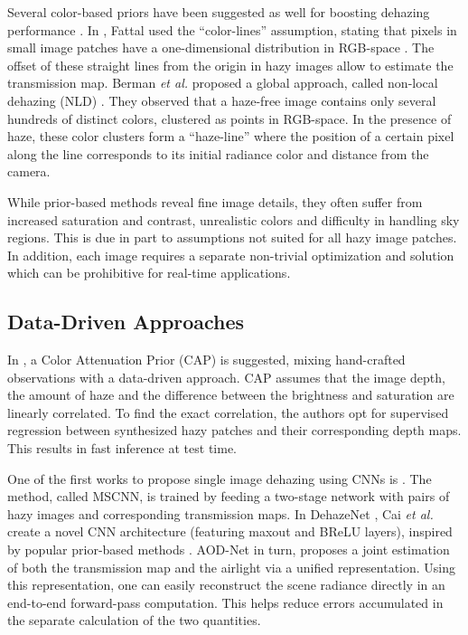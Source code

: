 \documentclass[10pt,twocolumn,twoside]{IEEEtran}
\begin{document}
Several color-based priors have been suggested as well for boosting dehazing performance \cite{color_lines,color_ellipsoid,NLD}. In \cite{color_lines}, Fattal used the ``color-lines'' assumption, stating that pixels in small image patches have a one-dimensional distribution in RGB-space \cite{color_lines_assumption}. The offset of these straight lines from the origin in hazy images allow to estimate the transmission map. Berman \textit{et al.} proposed a global approach, called non-local dehazing (NLD) \cite{NLD}. They observed that a haze-free image contains only several hundreds of distinct colors, clustered as points in RGB-space. In the presence of haze, these color clusters form a ``haze-line'' where the position of a certain pixel along the line corresponds to its initial radiance color and distance from the camera.

While prior-based methods reveal fine image details, they often suffer from increased saturation and contrast, unrealistic colors and difficulty in handling sky regions. This is due in part to assumptions not suited for all hazy image patches. In addition, each image requires a separate non-trivial optimization and solution which can be prohibitive for real-time applications.

\subsection{Data-Driven Approaches}

In \cite{CAP}, a Color Attenuation Prior (CAP) is suggested, mixing hand-crafted observations with a data-driven approach. CAP assumes that the image depth, the amount of haze and the difference between the brightness and saturation are linearly correlated. To find the exact correlation, the authors opt for supervised regression between synthesized hazy patches and their corresponding depth maps. This results in fast inference at test time.

One of the first works to propose single image dehazing using CNNs is \cite{mscnn}. The method, called MSCNN, is trained by feeding a two-stage network with pairs of hazy images and corresponding transmission maps. In DehazeNet \cite{dehazenet}, Cai \textit{et al.} create a novel CNN architecture
(featuring maxout and BReLU layers), inspired by popular prior-based methods \cite{DCP,contrast_tan,CAP,hue_dehazing}. AOD-Net \cite{aodnet} in turn, proposes a joint estimation of both the transmission map and the airlight via a unified representation. Using this representation, one can easily reconstruct the scene radiance directly in an end-to-end forward-pass computation. This helps reduce errors accumulated in the separate calculation of the two quantities.
\end{document}
